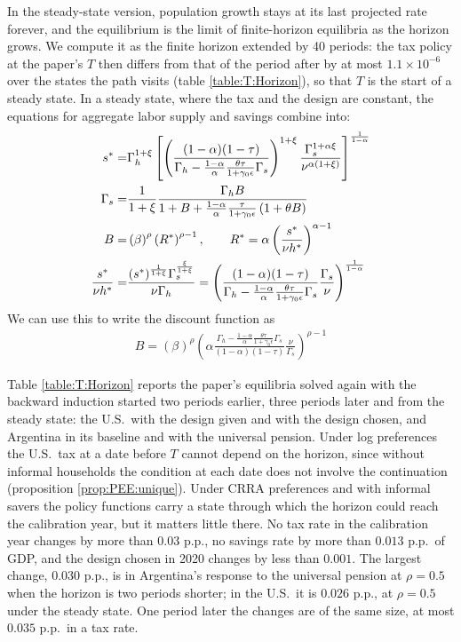 In the steady-state version, population growth stays at its last projected rate forever, and the equilibrium is the limit of finite-horizon equilibria as the horizon grows. We compute it as the finite horizon extended by 40 periods: the tax policy at the paper's $T$ then differs from that of the period after by at most $1.1 \times 10^{-6}$ over the states the path visits (table \ref{table:T:Horizon}), so that $T$ is the start of a steady state. In a steady state, where the tax and the design are constant, the equations for aggregate labor supply and savings combine into:
\begin{align}
    s^* =& \Gamma_h^{1+\xi}\left[\left(\frac{(1-\alpha)(1-\tau)}{\Gamma_h-\frac{1-\alpha}{\alpha}\frac{\theta\tau}{1+\gamma_0\epsilon}\Gamma_s}\right)^{1+\xi}\frac{\Gamma_s^{1+\alpha\xi}}{\nu^{\alpha(1+\xi)}}\right]^{\frac{1}{1-\alpha}} \\
    \Gamma_s =& \frac{1}{1+\xi}\frac{\Gamma_h B }{1+B+\frac{1-\alpha}{\alpha}\frac{\tau}{1+\gamma_0\epsilon}\left(1+\theta B\right)} \\
    B =& \left(\beta\right)^{\rho} \left(R^*\right)^{\rho-1}, \qquad R^* = \alpha\left(\frac{s^*}{\nu h^*}\right)^{\alpha-1} \notag \\
    \frac{s^*}{\nu h^*} =& \frac{(s^*)^{\frac{1}{1+\xi}}\Gamma_s^{\frac{\xi}{1+\xi}}}{\nu \Gamma_h} = \left(\frac{(1-\alpha)(1-\tau)}{\Gamma_h-\frac{1-\alpha}{\alpha}\frac{\theta\tau}{1+\gamma_0\epsilon}\Gamma_s}\frac{\Gamma_s}{\nu}\right)^{\frac{1}{1-\alpha}}
\end{align}
We can use this to write the discount function as
\begin{align}
    B = \left(\beta\right)^{\rho} \left(\alpha\frac{\Gamma_h-\frac{1-\alpha}{\alpha}\frac{\theta\tau}{1+\gamma_0\epsilon}\Gamma_s}{(1-\alpha)(1-\tau)}\frac{\nu}{\Gamma_s}   \right)^{\rho-1}
\end{align}

Table \ref{table:T:Horizon} reports the paper's equilibria solved again with the backward induction started two periods earlier, three periods later and from the steady state: the U.S.\ with the design given and with the design chosen, and Argentina in its baseline and with the universal pension. Under log preferences the U.S.\ tax at a date before $T$ cannot depend on the horizon, since without informal households the condition at each date does not involve the continuation (proposition \ref{prop:PEE:unique}). Under CRRA preferences and with informal savers the policy functions carry a state through which the horizon could reach the calibration year, but it matters little there. No tax rate in the calibration year changes by more than $0.03$ p.p., no savings rate by more than $0.013$ p.p.\ of GDP, and the design chosen in 2020 changes by less than $0.001$. The largest change, $0.030$ p.p., is in Argentina's response to the universal pension at $\rho = 0.5$ when the horizon is two periods shorter; in the U.S.\ it is $0.026$ p.p., at $\rho = 0.5$ under the steady state. One period later the changes are of the same size, at most $0.035$ p.p.\ in a tax rate.

